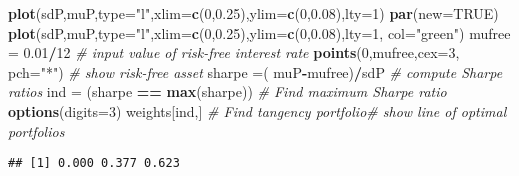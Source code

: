 \documentclass[]{article}
\newenvironment{Shaded}{\begin{snugshade}}{\end{snugshade}}
\newcommand{\CommentTok}[1]{\textcolor[rgb]{0.56,0.35,0.01}{\textit{#1}}}
\newcommand{\DataTypeTok}[1]{\textcolor[rgb]{0.13,0.29,0.53}{#1}}
\newcommand{\DecValTok}[1]{\textcolor[rgb]{0.00,0.00,0.81}{#1}}
\newcommand{\FloatTok}[1]{\textcolor[rgb]{0.00,0.00,0.81}{#1}}
\newcommand{\KeywordTok}[1]{\textcolor[rgb]{0.13,0.29,0.53}{\textbf{#1}}}
\newcommand{\NormalTok}[1]{#1}
\newcommand{\OperatorTok}[1]{\textcolor[rgb]{0.81,0.36,0.00}{\textbf{#1}}}
\newcommand{\OtherTok}[1]{\textcolor[rgb]{0.56,0.35,0.01}{#1}}
\newcommand{\StringTok}[1]{\textcolor[rgb]{0.31,0.60,0.02}{#1}}
\begin{document}
\begin{Shaded}
\begin{Highlighting}[]
\KeywordTok{plot}\NormalTok{(sdP,muP,}\DataTypeTok{type=}\StringTok{"l"}\NormalTok{,}\DataTypeTok{xlim=}\KeywordTok{c}\NormalTok{(}\DecValTok{0}\NormalTok{,}\FloatTok{0.25}\NormalTok{),}\DataTypeTok{ylim=}\KeywordTok{c}\NormalTok{(}\DecValTok{0}\NormalTok{,}\FloatTok{0.08}\NormalTok{),}\DataTypeTok{lty=}\DecValTok{1}\NormalTok{)}
\KeywordTok{par}\NormalTok{(}\DataTypeTok{new=}\OtherTok{TRUE}\NormalTok{)}
\KeywordTok{plot}\NormalTok{(sdP,muP,}\DataTypeTok{type=}\StringTok{"l"}\NormalTok{,}\DataTypeTok{xlim=}\KeywordTok{c}\NormalTok{(}\DecValTok{0}\NormalTok{,}\FloatTok{0.25}\NormalTok{),}\DataTypeTok{ylim=}\KeywordTok{c}\NormalTok{(}\DecValTok{0}\NormalTok{,}\FloatTok{0.08}\NormalTok{),}\DataTypeTok{lty=}\DecValTok{1}\NormalTok{, }\DataTypeTok{col=}\StringTok{"green"}\NormalTok{)}
\NormalTok{mufree =}\StringTok{ }\FloatTok{0.01}\OperatorTok{/}\DecValTok{12} \CommentTok{# input value of risk-free interest rate}
\KeywordTok{points}\NormalTok{(}\DecValTok{0}\NormalTok{,mufree,}\DataTypeTok{cex=}\DecValTok{3}\NormalTok{, }\DataTypeTok{pch=}\StringTok{"*"}\NormalTok{)  }\CommentTok{# show risk-free asset}
\NormalTok{sharpe =( muP}\OperatorTok{-}\NormalTok{mufree)}\OperatorTok{/}\NormalTok{sdP }\CommentTok{# compute Sharpe ratios}
\NormalTok{ind =}\StringTok{ }\NormalTok{(sharpe }\OperatorTok{==}\StringTok{ }\KeywordTok{max}\NormalTok{(sharpe)) }\CommentTok{# Find maximum Sharpe ratio}
\KeywordTok{options}\NormalTok{(}\DataTypeTok{digits=}\DecValTok{3}\NormalTok{)}
\NormalTok{weights[ind,] }\CommentTok{# Find tangency portfolio# show line of optimal portfolios}
\end{Highlighting}
\end{Shaded}

\begin{verbatim}
## [1] 0.000 0.377 0.623
\end{verbatim}
\end{document}
